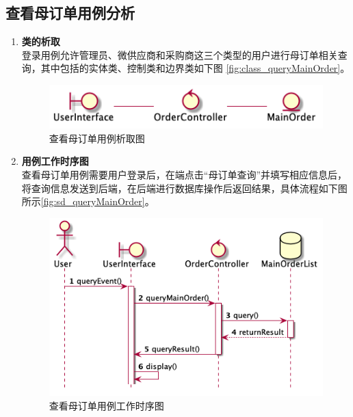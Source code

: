 	\subsection{查看母订单用例分析} %
	\label{sub:查看母订单用例分析}
	\begin{enumerate}
		\item \textbf{类的析取} \\
		登录用例允许管理员、微供应商和采购商这三个类型的用户进行母订单相关查询，其中包括的实体类、控制类和边界类如下图
		\autoref{fig:class_queryMainOrder}。
		\begin{figure}[htp]
		    \centering
		    \includegraphics[width=12cm]{report/figure/classAnalyse/queryMainOrder.png}
		    \caption{查看母订单用例析取图}
		    \label{fig:class_queryMainOrder}
		\end{figure}

		\item \textbf{用例工作时序图} \\
		查看母订单用例需要用户登录后，在端点击“母订单查询”并填写相应信息后，将查询信息发送到后端，在后端进行数据库操作后返回结果，具体流程如下图所示\autoref{fig:sd_queryMainOrder}。

		\begin{figure}[htp]
		    \centering
		    \includegraphics[width=12cm]{report/figure/sequenceDiagram/sd_queryMainOrder.png}
		    \caption{查看母订单用例工作时序图}
		    \label{fig:sd_queryMainOrder}
		\end{figure}

	\end{enumerate}
	
